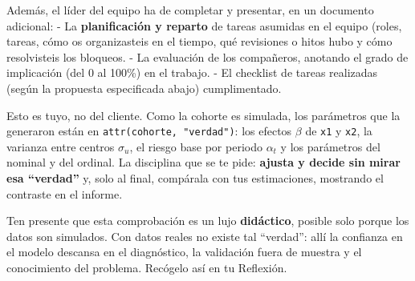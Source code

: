\documentclass[
  letterpaper,
  DIV=11,
  numbers=noendperiod]{scrartcl}
\begin{document}
\begin{tcolorbox}[enhanced jigsaw, breakable, colframe=quarto-callout-important-color-frame, left=2mm, arc=.35mm, colbacktitle=quarto-callout-important-color!10!white, toprule=.15mm, colback=white, coltitle=black, rightrule=.15mm, opacitybacktitle=0.6, title=\textcolor{quarto-callout-important-color}{\faExclamation}\hspace{0.5em}{Importante}, titlerule=0mm, toptitle=1mm, bottomtitle=1mm, leftrule=.75mm, bottomrule=.15mm, opacityback=0]

Además, el líder del equipo ha de completar y presentar, en un documento
adicional: - La \textbf{planificación y reparto} de tareas asumidas en
el equipo (roles, tareas, cómo os organizasteis en el tiempo, qué
revisiones o hitos hubo y cómo resolvisteis los bloqueos. - La
evaluación de los compañeros, anotando el grado de implicación (del 0 al
100\%) en el trabajo. - El checklist de tareas realizadas (según la
propuesta especificada abajo) cumplimentado.

\end{tcolorbox}

\begin{tcolorbox}[enhanced jigsaw, breakable, colframe=quarto-callout-tip-color-frame, left=2mm, arc=.35mm, colbacktitle=quarto-callout-tip-color!10!white, toprule=.15mm, colback=white, coltitle=black, rightrule=.15mm, opacitybacktitle=0.6, title=\textcolor{quarto-callout-tip-color}{\faLightbulb}\hspace{0.5em}{Control de calidad interno: ajusta a ciegas y valida contra el DGP}, titlerule=0mm, toptitle=1mm, bottomtitle=1mm, leftrule=.75mm, bottomrule=.15mm, opacityback=0]

Esto es tuyo, no del cliente. Como la cohorte es simulada, los
parámetros que la generaron están en \texttt{attr(cohorte,\ "verdad")}:
los efectos \(\beta\) de \texttt{x1} y \texttt{x2}, la varianza entre
centros \(\sigma_u\), el riesgo base por periodo \(\alpha_t\) y los
parámetros del nominal y del ordinal. La disciplina que se te pide:
\textbf{ajusta y decide sin mirar esa ``verdad''} y, solo al final,
compárala con tus estimaciones, mostrando el contraste en el informe.

Ten presente que esta comprobación es un lujo \textbf{didáctico},
posible solo porque los datos son simulados. Con datos reales no existe
tal ``verdad'': allí la confianza en el modelo descansa en el
diagnóstico, la validación fuera de muestra y el conocimiento del
problema. Recógelo así en tu Reflexión.

\end{tcolorbox}
\end{document}
